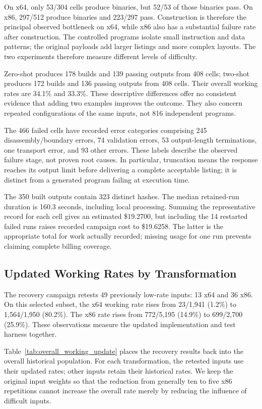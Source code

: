 On x64, only 53/304 cells produce binaries, but 52/53 of those binaries
pass. On x86, 297/512 produce binaries and 223/297 pass. Construction is
therefore the principal observed bottleneck on x64, while x86 also has a
substantial failure rate after construction. The controlled programs isolate small instruction and data patterns;
the original payloads add larger listings and more complex layouts.
The two experiments therefore measure different levels of difficulty.

Zero-shot produces 178 builds and 139 passing outputs from 408 cells;
two-shot produces 172 builds and 136 passing outputs from 408 cells.
Their overall working rates are 34.1\% and 33.3\%. These descriptive
differences offer no consistent evidence that adding two examples improves
the outcome. They also concern repeated configurations of the same inputs,
not 816 independent programs.

The 466 failed cells have recorded error categories comprising 245
disassembly/boundary errors, 74 validation errors, 53 output-length
terminations, one transport error, and 93 other errors. These labels
describe the observed failure stage, not proven root causes. In particular,
truncation means the response reaches its output limit before delivering
a complete acceptable listing; it is distinct from a generated program
failing at execution time.

The 350 built outputs contain 323 distinct hashes. The median retained-run duration is
160.3 seconds, including local processing. Summing the representative
record for each cell gives an estimated \$19.2700, but including the
14 restarted failed runs raises recorded campaign cost to
\$19.6258. The latter is the appropriate total for work actually recorded;
missing usage for one run prevents claiming complete billing coverage.

\subsection{Updated Working Rates by Transformation}
\label{sec:recovery}
The recovery campaign retests 49 previously low-rate inputs: 13 x64 and
36 x86. On this selected subset, the x64 working rate rises from
23/1,941 (1.2\%) to 1,564/1,950 (80.2\%). The x86 rate rises from
772/5,195 (14.9\%) to 699/2,700 (25.9\%). These observations measure
the updated implementation and test harness together.

Table~\ref{tab:overall_working_update} places the recovery results back
into the overall historical population. For each transformation, the
retested inputs use their updated rates; other inputs retain their
historical rates. We keep the original input weights so that the reduction
from generally ten to five x86 repetitions cannot increase the overall
rate merely by reducing the influence of difficult inputs.

